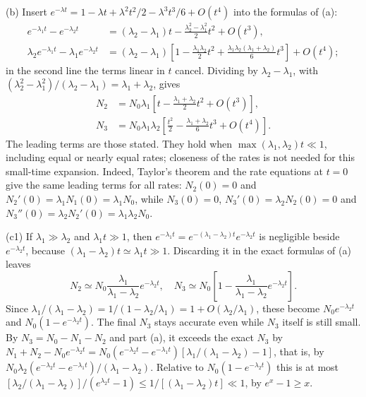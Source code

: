 (b) Insert $e^{-\lambda t}=1-\lambda t+\lambda^2t^2/2
-\lambda^3t^3/6+O(t^4)$ into the formulas of (a):
\begin{align*}
e^{-\lambda_1t}-e^{-\lambda_2t}
&=(\lambda_2-\lambda_1)t-\frac{\lambda_2^2-\lambda_1^2}2t^2
+O(t^3),\\
\lambda_2e^{-\lambda_1t}-\lambda_1e^{-\lambda_2t}
&=(\lambda_2-\lambda_1)\left[1-\frac{\lambda_1\lambda_2}2t^2
+\frac{\lambda_1\lambda_2(\lambda_1+\lambda_2)}6t^3\right]
+O(t^4);
\end{align*}
in the second line the terms linear in $t$ cancel. Dividing by
$\lambda_2-\lambda_1$, with
$(\lambda_2^2-\lambda_1^2)/(\lambda_2-\lambda_1)=\lambda_1+\lambda_2$,
gives
\begin{align*}
N_2&=N_0\lambda_1\left[t-
\frac{\lambda_1+\lambda_2}{2}t^2+O(t^3)\right],\\
N_3&=N_0\lambda_1\lambda_2\left[
\frac{t^2}{2}-\frac{\lambda_1+\lambda_2}{6}t^3+O(t^4)\right].
\end{align*}
The leading terms are those stated. They hold when
$\max(\lambda_1,\lambda_2)t\ll1$, including equal or nearly
equal rates; closeness of the rates is not needed for this
small-time expansion. Indeed, Taylor's theorem and the rate
equations at $t=0$ give the same leading terms for all rates:
$N_2(0)=0$ and $N_2'(0)=\lambda_1N_1(0)=\lambda_1N_0$, while
$N_3(0)=0$, $N_3'(0)=\lambda_2N_2(0)=0$ and
$N_3''(0)=\lambda_2N_2'(0)=\lambda_1\lambda_2N_0$.

(c1) If $\lambda_1\gg\lambda_2$ and $\lambda_1t\gg1$, then
$e^{-\lambda_1t}=e^{-(\lambda_1-\lambda_2)t}e^{-\lambda_2t}$ is
negligible beside $e^{-\lambda_2t}$, because
$(\lambda_1-\lambda_2)t\simeq\lambda_1t\gg1$. Discarding it in
the exact formulas of (a) leaves
\[
N_2\simeq N_0\frac{\lambda_1}{\lambda_1-\lambda_2}e^{-\lambda_2t},
\quad
N_3\simeq N_0\left[1-
\frac{\lambda_1}{\lambda_1-\lambda_2}e^{-\lambda_2t}\right].
\]
Since $\lambda_1/(\lambda_1-\lambda_2)=1/(1-\lambda_2/\lambda_1)
=1+O(\lambda_2/\lambda_1)$,
these become $N_0e^{-\lambda_2t}$ and
$N_0(1-e^{-\lambda_2t})$.
The final $N_3$ stays accurate even while $N_3$ itself is
still small. By $N_3=N_0-N_1-N_2$ and part (a), it exceeds
the exact $N_3$ by
$N_1+N_2-N_0e^{-\lambda_2t}=N_0(e^{-\lambda_2t}-e^{-\lambda_1t})
[\lambda_1/(\lambda_1-\lambda_2)-1]$, that is, by
$N_0\lambda_2(e^{-\lambda_2t}-e^{-\lambda_1t})/(\lambda_1-\lambda_2)$.
Relative to $N_0(1-e^{-\lambda_2t})$ this is at most
$[\lambda_2/(\lambda_1-\lambda_2)]/(e^{\lambda_2t}-1)
\le1/[(\lambda_1-\lambda_2)t]\ll1$, by $e^x-1\ge x$.

